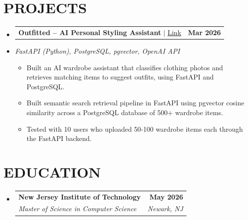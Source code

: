 \documentclass[letterpaper,11pt]{article}
\makeatletter
\newcommand{\resumeItem}[1]{
  \item\small{#1\vspace{-3pt}}
}
\newcommand{\resumeStack}[1]{
  \vspace{1pt}\item\small{\textit{#1}}\vspace{-6pt}
}
\newcommand{\resumeSubheading}[4]{
  \vspace{-3pt}\item
    \begin{tabular*}{1.0\textwidth}[t]{l@{\extracolsep{\fill}}r}
      \textbf{#1} & \textbf{\small #2} \\
      \textit{\small#3} & \textit{\small #4} \\
    \end{tabular*}\vspace{-9pt}
}
\newcommand{\resumeProjectHeading}[2]{
    \item
    \begin{tabular*}{1.001\textwidth}{l@{\extracolsep{\fill}}r}
      \small#1 & \textbf{\small #2}\\
    \end{tabular*}\vspace{-9pt}
}
\newcommand{\resumeItemListStart}{\begin{itemize}[leftmargin=0.15in, label=$\bullet$]}
\newcommand{\resumeItemListEnd}{\end{itemize}\vspace{-7pt}}
\newcommand{\resumeSubHeadingListStart}{\begin{itemize}[leftmargin=0.0in, label={}]}
\newcommand{\resumeSubHeadingListEnd}{\end{itemize}}
\makeatother
\begin{document}
\section{PROJECTS}
\resumeSubHeadingListStart

\resumeProjectHeading
{\textbf{Outfitted -- AI Personal Styling Assistant} $|$ \href{https://github.com/talaviyakhushi/outfitted}{Link}}{Mar 2026}
\vspace{-9pt}
\resumeStack{FastAPI (Python), PostgreSQL, pgvector, OpenAI API}
\resumeItemListStart
  \resumeItem{Built an AI wardrobe assistant that classifies clothing photos and retrieves matching items to suggest outfits, using FastAPI and PostgreSQL.}
  \resumeItem{Built semantic search retrieval pipeline in FastAPI using pgvector cosine similarity across a PostgreSQL database of 500+ wardrobe items.}
  \resumeItem{Tested with 10 users who uploaded 50-100 wardrobe items each through the FastAPI backend.}
\resumeItemListEnd

\resumeSubHeadingListEnd
\vspace{-3pt}
\section{EDUCATION}
\vspace{1pt}
\resumeSubHeadingListStart
\vspace{5pt}
\resumeSubheading
{New Jersey Institute of Technology}{May 2026}
{Master of Science in Computer Science}{Newark, NJ}
\resumeSubHeadingListEnd
\end{document}
